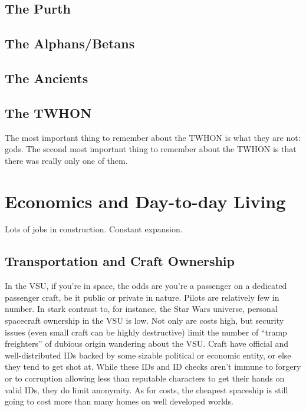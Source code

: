 \subsection{The Purth}

\subsection{The Alphans/Betans}

\subsection{The Ancients}

\subsection{The TWHON}
The most important thing to remember about the TWHON is what they are
not: gods. The second most important thing to remember about the TWHON
is that there was really only one of them.


\section{Economics and Day-to-day Living}

Lots of jobs in construction. Constant expansion.

\subsection{Transportation and Craft Ownership}

In the VSU, if you're in space, the odds are you're a passenger on a
dedicated passenger craft, be it public or private in nature. Pilots
are relatively few in number. In stark contrast to, for instance, the
Star Wars universe, personal spacecraft ownership in the VSU is
low. Not only are costs high, but security issues (even small craft
can be highly destructive) limit the number of ``tramp freighters'' of
dubious origin wandering about the VSU. Craft have official and
well-distributed IDs backed by some sizable political or economic
entity, or else they tend to get shot at. While these IDs and ID
checks aren't immune to forgery or to corruption allowing less than
reputable characters to get their hands on valid IDs, they do limit
anonymity. As for costs, the cheapest spaceship is still going to cost
more than many homes on well developed worlds.

